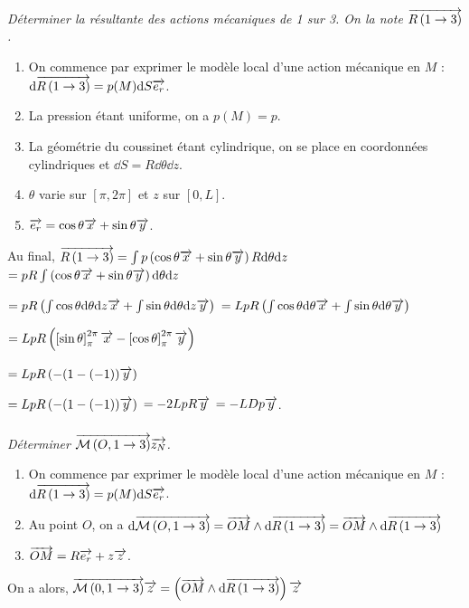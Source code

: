 \documentclass[10pt,fleqn]{article} %
\begin{document}
\begin{multicols}{2}
\begin{multicols}{2}
\subparagraph{}\textit{Déterminer la résultante des actions mécaniques de 1 sur 3. On la note $\overrightarrow{R\left( {1} \rightarrow {3}\right)}$.}
\ifprof
\begin{corrige}
\begin{enumerate}
\item On commence par exprimer le modèle local d'une action mécanique en $M$ : $\text{d} \overrightarrow{R\left( {1} \rightarrow {3}\right)} = p(M) \text{d} S \overrightarrow{e_r}$.
\item La pression étant uniforme, on a $p(M)=p$.
\item La géométrie du coussinet étant cylindrique, on se place en coordonnées cylindriques et $\dd S = R\dd \theta \dd z$.  
\item $\theta$ varie sur $[\pi, 2\pi]$ et $z$ sur $[0,L]$. 
\item $\overrightarrow{e_r}=\cos\theta\overrightarrow{x}+\sin\theta\overrightarrow{y}$.
\end{enumerate}
Au final, $\overrightarrow{R\left( {1} \rightarrow {3}\right)}=\int p  \left( \cos\theta\overrightarrow{x}+\sin\theta\overrightarrow{y}\right)R\text{d} \theta \text{d} z$
$=pR\int \left( \cos\theta\overrightarrow{x}+\sin\theta\overrightarrow{y}\right)\text{d} \theta \text{d} z$

$=pR\left( \int  \cos\theta\text{d} \theta \text{d} z \overrightarrow{x}+\int \sin\theta\text{d} \theta \text{d} z   \overrightarrow{y}\right)$
$=LpR\left( \int  \cos\theta\text{d} \theta  \overrightarrow{x}+\int \sin\theta\text{d} \theta   \overrightarrow{y}\right)$

$=LpR\left( \left[ \sin \theta \right]^{2\pi}_{\pi}  \overrightarrow{x}-\left[\cos \theta \right]^{2\pi}_{\pi}   \overrightarrow{y}\right)$

$=LpR\left( -(1-(-1))   \overrightarrow{y}\right)$

$=LpR\left( -(1-(-1))   \overrightarrow{y}\right)$ $=-2LpR   \overrightarrow{y}$ $=-LDp   \overrightarrow{y}$.

\end{corrige}
\else
\fi


\subparagraph{}\textit{Déterminer $\overrightarrow{\mathcal{M}\left( {O}, {1} \rightarrow {3}\right)}\overrightarrow{z_N}$.}
\ifprof
\begin{corrige}
\begin{enumerate}
\item On commence par exprimer le modèle local d'une action mécanique en $M$ : $\text{d} \overrightarrow{R\left( {1} \rightarrow {3}\right)} = p(M) \text{d} S \overrightarrow{e_r}$.
\item Au point $O$, on a $\text{d} \overrightarrow{\mathcal{M}\left( {O}, {1} \rightarrow {3}\right)}=\overrightarrow{OM}\wedge \text{d} \overrightarrow{R\left( {1} \rightarrow {3}\right)} =\overrightarrow{OM}\wedge \text{d} \overrightarrow{R\left( {1} \rightarrow {3}\right)} $
\item $\overrightarrow{OM}=R\overrightarrow{e_r}+z\overrightarrow{z}$.
\end{enumerate}
On a alors, $ \overrightarrow{\mathcal{M}\left( {0}, {1} \rightarrow {3}\right)}\overrightarrow{z} =\left( \overrightarrow{OM}\wedge \text{d} \overrightarrow{R\left( {1} \rightarrow {3}\right)}\right) \overrightarrow{z}$


\end{corrige}
\end{multicols}
\end{multicols}
\end{document}
